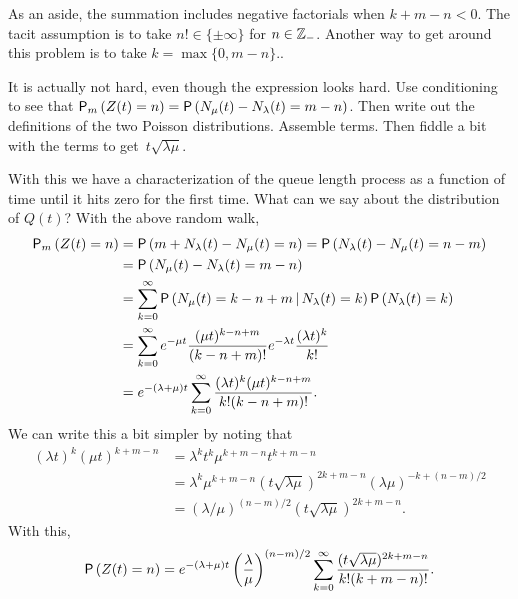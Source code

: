 \begin{exercise}
As an aside, the summation includes negative factorials when
$k+m-n<0$. The tacit assumption is to take $n!\in \{\pm \infty\}$ for
$n\in \mathbb{Z}_-$. Another way to get around this problem is to take
$k=\max\{0, m-n\}$..
\begin{hint}
It is actually not hard, even though the expression looks
  hard. Use conditioning to see that
  $\P{Z(t)=n}_m = \P{N_\mu(t) - N_\lambda(t) = m - n}$. Then write out
  the definitions of the two Poisson distributions. Assemble
  terms. Then fiddle a bit with the terms to get~$t\sqrt{\lambda\mu}$. 
\end{hint}
\begin{solution}
With this we have a characterization of the queue length process as a
function of time until it hits zero for the first time. What can we
say about the distribution of $Q(t)$? With the above random walk, 
\begin{equation}\label{eq:29}
  \begin{split}
    \P{Z(t)=n}_m
&= \P{m+N_\lambda(t) - N_\mu(t) = n }  = \P{N_\lambda(t) - N_\mu(t) = n-m }  \\
&= \P{N_\mu(t) - N_\lambda(t) = m-n }  \\
&= \sum_{k=0}^\infty \P{N_\mu(t) = k - n + m\given N_\lambda(t) = k } \P{N_\lambda(t)=k}\\
&= \sum_{k=0}^\infty e^{-\mu t} \frac{(\mu t)^{k -n+m}}{(k-n +m)!} e^{-\lambda t} \frac{(\lambda t)^k}{k!} \\
&= e^{-(\lambda+\mu)t} \sum_{k=0}^\infty \frac{(\lambda t)^k(\mu t)^{k  -n + m }}{k!(k-n+m)!}.
  \end{split}
\end{equation}
We can write this a bit simpler by noting that
\begin{align*}
  (\lambda t)^k (\mu t) ^{k + m - n}  
&=  \lambda^k t^k\mu^{k + m - n} t^{k+m-n} \\
&= \lambda^k \mu^{k + m - n} (t\sqrt{\lambda \mu})^{2k+m-n} (\lambda\mu)^{-k + (n-m)/2} \\
&= (\lambda/\mu)^{(n-m)/2} (t\sqrt{\lambda \mu})^{2k+m-n}.
\end{align*}
With this,
\begin{equation*}
    \P{Z(t)=n} 
= e^{-(\lambda+\mu)t} \left(\frac\lambda\mu\right)^{(n-m)/2} \sum_{k=0}^\infty 
\frac{(t\sqrt{\lambda\mu} )^{2k+m-n}}{k!(k+m-n)!}.
\end{equation*}
\end{solution}
\end{exercise}


